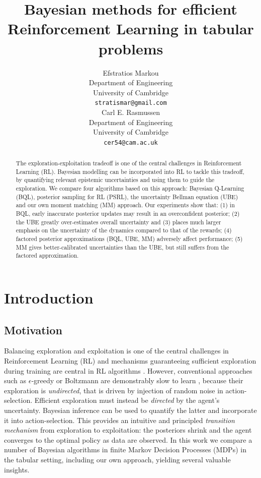 \documentclass{article}
\title{Bayesian methods for efficient\\Reinforcement Learning in tabular problems}
\author{%
  Efstratios Markou \\
  Department of Engineering\\
  University of Cambridge\\
  \texttt{stratismar@gmail.com} \\
  \And
  Carl E. Rasmussen \\
  Department of Engineering\\
  University of Cambridge\\
  \texttt{cer54@cam.ac.uk}
}
\begin{document}
\maketitle

\begin{abstract}
The exploration-exploitation tradeoff is one of the central challenges in Reinforcement Learning (RL). Bayesian modelling can be incorporated into RL to tackle this tradeoff, by quantifying relevant epistemic uncertainties and using them to guide the exploration. We compare four algorithms based on this approach: Bayesian Q-Learning (BQL), posterior sampling for RL (PSRL), the uncertainty Bellman equation (UBE) and our own moment matching (MM) approach. Our experiments show that: (1) in BQL, early inaccurate posterior updates may result in an overconfident posterior; (2) the UBE greatly over-estimates overall uncertainty and (3) places much larger emphasis on the uncertainty of the dynamics compared to that of the rewards; (4) factored posterior approximations (BQL, UBE, MM) adversely affect performance; (5) MM gives better-calibrated uncertainties than the UBE, but still suffers from the factored approximation.
\end{abstract}

\section{Introduction}

\subsection{Motivation}
Balancing exploration and exploitation is one of the central challenges in Reinforcement Learning (RL) and mechanisms guaranteeing sufficient exploration during training are central in RL algorithms \citep{suttonbarto}. However, conventional approaches such as $\epsilon$-greedy or Boltzmann are demonstrably slow to learn \citep{iothesis}, because their exploration is \textit{undirected}, that is driven by injection of random noise in action-selection. Efficient exploration must instead be \textit{directed} by the agent's uncertainty. Bayesian inference can be used to quantify the latter and incorporate it into action-selection. This provides an intuitive and principled \textit{transition mechanism} from exploration to exploitation: the posteriors shrink and the agent converges to the optimal policy as data are observed. In this work we compare a number of Bayesian algorithms in finite Markov Decision Processes (MDPs) in the tabular setting, including our own approach, yielding several valuable insights.
\end{document}
